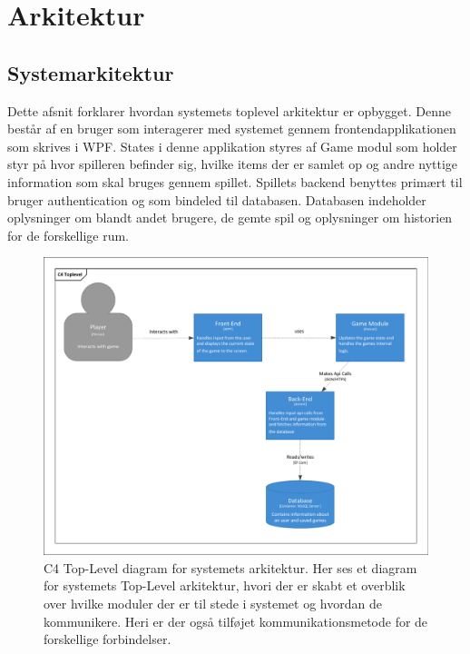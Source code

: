 \section{Arkitektur}

\subsection{Systemarkitektur}
\noindent
Dette afsnit forklarer hvordan systemets toplevel arkitektur er opbygget.
Denne består af en bruger som interagerer med systemet gennem frontendapplikationen som skrives i WPF. States i denne applikation styres af Game modul som holder styr på hvor spilleren befinder sig, hvilke items der er samlet op og andre nyttige information som skal bruges gennem spillet.
Spillets backend benyttes primært til bruger authentication og som bindeled til databasen.
Databasen indeholder oplysninger om blandt andet brugere, de gemte spil og oplysninger om historien for de forskellige rum.

\begin{figure}[h]
\centering
\includegraphics[width = \textwidth]{02-Body/Images/Arkitektur - C4TopLevel.pdf}
\caption{C4 Top-Level diagram for systemets arkitektur. Her ses et diagram for systemets Top-Level arkitektur, hvori der er skabt et overblik over hvilke moduler der er til stede i systemet og hvordan de kommunikere. Heri er der også tilføjet kommunikationsmetode for de forskellige forbindelser.}
\label{fig:Arkitektur-SD-SaveGame}
\end{figure}

